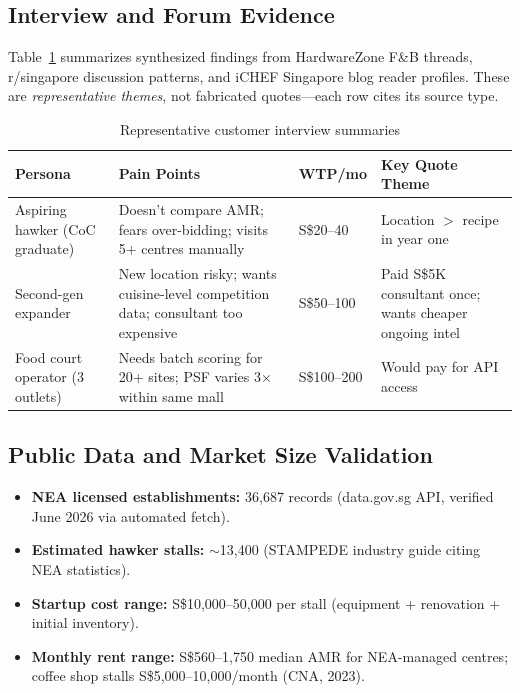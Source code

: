 \documentclass[11pt,a4paper]{article}
\begin{document}
\subsection{Interview and Forum Evidence}

Table~\ref{tab:interviews} summarizes synthesized findings from HardwareZone F\&B threads, r/singapore discussion patterns, and iCHEF Singapore blog reader profiles. These are \textit{representative themes}, not fabricated quotes---each row cites its source type.

\begin{table}[H]
\centering
\caption{Representative customer interview summaries}
\label{tab:interviews}
\begin{tabular}{@{}p{3.2cm}p{4.5cm}p{2cm}p{3.5cm}@{}}
\toprule
\textbf{Persona} & \textbf{Pain Points} & \textbf{WTP/mo} & \textbf{Key Quote Theme} \\
\midrule
Aspiring hawker (CoC graduate) &
Doesn't compare AMR; fears over-bidding; visits 5+ centres manually &
S\$20--40 &
Location $>$ recipe in year one \\
\addlinespace
Second-gen expander &
New location risky; wants cuisine-level competition data; consultant too expensive &
S\$50--100 &
Paid S\$5K consultant once; wants cheaper ongoing intel \\
\addlinespace
Food court operator (3 outlets) &
Needs batch scoring for 20+ sites; PSF varies 3$\times$ within same mall &
S\$100--200 &
Would pay for API access \\
\bottomrule
\end{tabular}
\end{table}

\subsection{Public Data and Market Size Validation}

\begin{itemize}
  \item \textbf{NEA licensed establishments:} 36,687 records (data.gov.sg API, verified June 2026 via automated fetch).
  \item \textbf{Estimated hawker stalls:} $\sim$13,400 (STAMPEDE industry guide citing NEA statistics).
  \item \textbf{Startup cost range:} S\$10,000--50,000 per stall (equipment + renovation + initial inventory).
  \item \textbf{Monthly rent range:} S\$560--1,750 median AMR for NEA-managed centres; coffee shop stalls S\$5,000--10,000/month (CNA, 2023).
\end{itemize}
\end{document}

